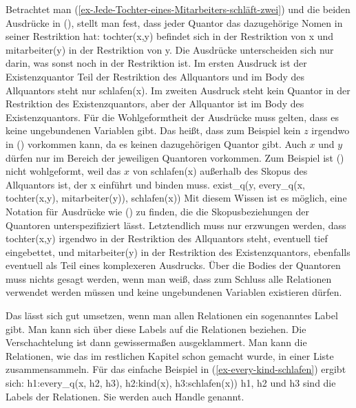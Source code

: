Betrachtet man (\ref{ex-Jede-Tochter-eines-Mitarbeiters-schläft-zwei}) und die beiden Ausdrücke in
(), stellt man fest, dass jeder Quantor das dazugehörige Nomen in seiner Restriktion hat:
tochter(x,y) befindet sich in der Restriktion von x und mitarbeiter(y) in der Restriktion von y. Die
Ausdrücke unterscheiden sich nur darin, was sonst noch in der Restriktion ist. Im ersten Ausdruck
ist der Existenzquantor Teil der Restriktion des Allquantors und im Body des Allquantors steht nur
schlafen(x). Im zweiten Ausdruck steht kein Quantor in der Restriktion des Existenzquantors, aber
der Allquantor ist im Body des Existenzquantors. Für die Wohlgeformtheit der Ausdrücke muss gelten,
dass es keine ungebundenen Variablen gibt. Das heißt, dass zum Beispiel kein $z$ irgendwo in
() vorkommen kann, da es keinen dazugehörigen Quantor gibt. Auch $x$ und $y$ dürfen nur im
Bereich der jeweiligen Quantoren vorkommen. Zum Beispiel ist () nicht wohlgeformt, weil das
$x$ von schlafen(x) außerhalb des Skopus des Allquantors ist, der x einführt und binden muss.
\ea
exist\_q(y, every\_q(x, tochter(x,y), mitarbeiter(y)),  schlafen(x))
\z
Mit diesem Wissen ist es möglich, eine Notation für
Ausdrücke wie () zu finden, die die Skopusbeziehungen der Quantoren unterspezifiziert
lässt. Letztendlich muss nur erzwungen werden, dass tochter(x,y) irgendwo in der Restriktion des
Allquantors steht, eventuell tief eingebettet, und mitarbeiter(y) in der Restriktion des
Existenzquantors, ebenfalls eventuell als Teil eines komplexeren Ausdrucks. Über die Bodies der
Quantoren muss nichts gesagt werden, wenn man weiß, dass zum Schluss alle Relationen verwendet
werden müssen und keine ungebundenen Variablen existieren dürfen. 

Das lässt sich gut umsetzen, wenn man allen Relationen ein sogenanntes Label gibt. Man kann sich
über diese Labels auf die Relationen beziehen. Die Verschachtelung ist dann gewissermaßen
ausgeklammert. Man kann die Relationen, wie das im restlichen Kapitel schon gemacht wurde, in einer
Liste zusammensammeln. Für das einfache Beispiel in (\ref{ex-every-kind-schlafen}) ergibt sich:
\ea
\label{ex-every-kind-schlafen-handles}
h1:every\_q(x, h2, h3), h2:kind(x), h3:schlafen(x))
\z
h1, h2 und h3 sind die Labels der Relationen. Sie werden auch Handle genannt.

